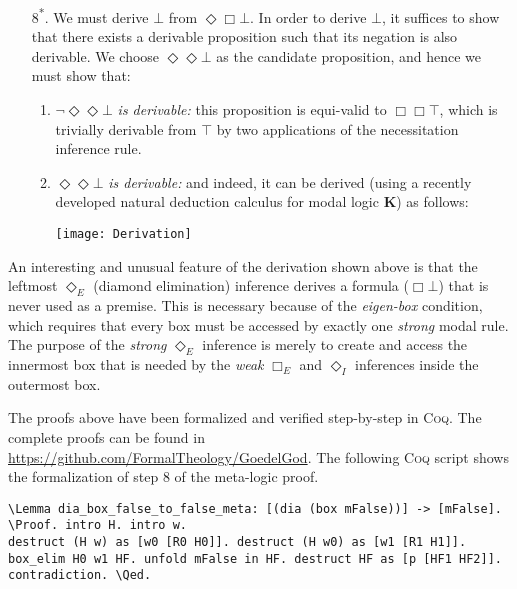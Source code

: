 \documentclass{llncs}
\newcommand{\red}[1]{\textcolor[rgb]{1,0,0}{#1}}
\newcommand{\blue}[1]{\textcolor[rgb]{0,0,1}{#1}}
\newcommand{\Lemma}{\red{Lemma}}
\newcommand{\Proof}{\blue{Proof}}
\newcommand{\Qed}{\blue{Qed}}
\newcommand{\verbsize}{\scriptsize}
\newcommand{\logic}[1]{\textbf{#1}\xspace}
\newcommand{\K}{\logic{K}}
\newcommand{\Dia}{\Diamond} %
\newcommand{\nec}{\Box}
\newcommand{\pos}{\Dia}
\begin{document}
\begin{enumerate}
\item[8\textsuperscript{*}.] We must derive $\bot$ from $\pos \nec \bot$. In order to derive $\bot$, it suffices to show that there exists a derivable proposition such that its negation is also derivable. We choose $\pos \pos \bot$ as the candidate proposition, and hence we must show that:
\begin{enumerate}
\item $\neg \pos \pos \bot$ \emph{is derivable:} this proposition is equi-valid to $\nec \nec \top$, which is trivially derivable from $\top$ by two applications of the necessitation inference rule.

\item $\pos \pos \bot$ \emph{is derivable:} and indeed, it can be
  derived (using a recently developed natural deduction calculus for
  modal logic \K \cite{CSR}) as follows: \\

\begin{center}
\texttt{[image: Derivation]}
\end{center}

\end{enumerate}

\end{enumerate}

An interesting and unusual feature of the derivation shown above is that the leftmost $\pos_E$ (diamond elimination) inference derives a formula ($\nec \bot$) that is never used as a premise. This is necessary because of the \emph{eigen-box} condition, which requires that every box must be accessed by exactly one \emph{strong} modal rule. The purpose of the \emph{strong} $\pos_E$ inference is merely to create and access the innermost box that is needed by the \emph{weak} $\nec_E$ and $\pos_I$ inferences inside the outermost box.

The proofs above have been formalized and verified step-by-step in \textsc{Coq}. The complete proofs can be found in \url{https://github.com/FormalTheology/GoedelGod}. The following \textsc{Coq} script shows the formalization of step 8 of the meta-logic proof.


\begin{Verbatim}[frame=single,commandchars=\\\{\},fontsize=\verbsize]
\Lemma dia_box_false_to_false_meta: [(dia (box mFalse))] -> [mFalse].
\Proof. intro H. intro w.
destruct (H w) as [w0 [R0 H0]]. destruct (H w0) as [w1 [R1 H1]].
box_elim H0 w1 HF. unfold mFalse in HF. destruct HF as [p [HF1 HF2]].
contradiction. \Qed.
\end{Verbatim}
\end{document}
